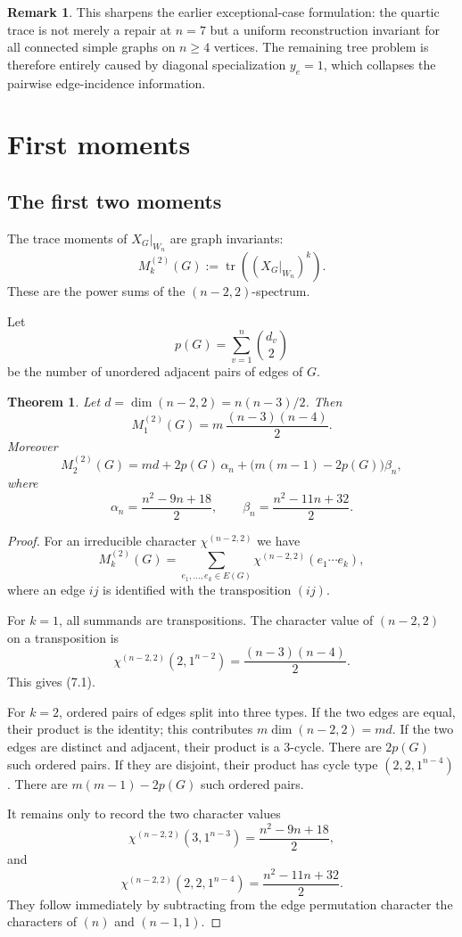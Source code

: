 \documentclass{amsart}
\newtheorem{theorem}{Theorem}
\theoremstyle{definition}
\newtheorem{remark}{Remark}
\newcommand{\tr}{\operatorname{tr}}
\begin{document}
\begin{remark}
This sharpens the earlier exceptional-case formulation: the quartic trace
is not merely a repair at $n=7$ but a uniform reconstruction invariant for
all connected simple graphs on $n\geq4$ vertices.  The remaining tree
problem is therefore entirely caused by diagonal specialization
$y_e=1$, which collapses the pairwise edge-incidence information.
\end{remark}

\section{First moments}

\subsection{The first two moments} 


The trace moments of $X_G|_{W_n}$ are graph invariants:
\[
M_k^{(2)}(G):=\tr\left((X_G|_{W_n})^k\right).
\]
These are the power sums of the $(n-2,2)$-spectrum.

Let
\[
p(G)=\sum_{v=1}^n \binom{d_v}{2}
\]
be the number of unordered adjacent pairs of edges of $G$.

\begin{theorem}
Let $d=\dim(n-2,2)=n(n-3)/2$.  Then
\[
M_1^{(2)}(G)=m\,\frac{(n-3)(n-4)}2.
\tag{7.1}
\]
Moreover
\[
M_2^{(2)}(G)
=md+2p(G)\,\alpha_n+\bigl(m(m-1)-2p(G)\bigr)\beta_n,
\tag{7.2}
\]
where
\[
\alpha_n=\frac{n^2-9n+18}{2},\qquad
\beta_n=\frac{n^2-11n+32}{2}.
\]
\end{theorem}

\begin{proof}
For an irreducible character $\chi^{(n-2,2)}$ we have
\[
M_k^{(2)}(G)=\sum_{e_1,\ldots,e_k\in E(G)}
\chi^{(n-2,2)}(e_1\cdots e_k),
\]
where an edge $ij$ is identified with the transposition $(ij)$.

For $k=1$, all summands are transpositions.  The character value of
$(n-2,2)$ on a transposition is
\[
\chi^{(n-2,2)}(2,1^{n-2})=\frac{(n-3)(n-4)}2.
\]
This gives (7.1).

For $k=2$, ordered pairs of edges split into three types.  If the two
edges are equal, their product is the identity; this contributes
$m\dim(n-2,2)=md$.  If the two edges are distinct and adjacent, their
product is a $3$-cycle.  There are $2p(G)$ such ordered pairs.  If they
are disjoint, their product has cycle type $(2,2,1^{n-4})$.  There are
$m(m-1)-2p(G)$ such ordered pairs.

It remains only to record the two character values
\[
\chi^{(n-2,2)}(3,1^{n-3})=\frac{n^2-9n+18}{2},
\]
and
\[
\chi^{(n-2,2)}(2,2,1^{n-4})=\frac{n^2-11n+32}{2}.
\]
They follow immediately by subtracting from the edge permutation
character the characters of $(n)$ and $(n-1,1)$.
\end{proof}
\end{document}
